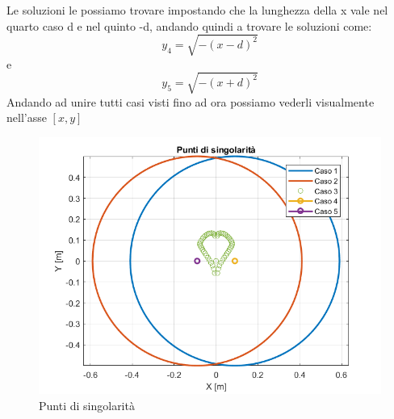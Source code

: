 Le soluzioni le possiamo trovare impostando che la lunghezza della x vale nel quarto caso d e nel quinto -d, andando quindi a trovare le soluzioni come:
\begin{equation}
    y_4 = \sqrt{-(x-d)^2}
\end{equation}
e
\begin{equation}
    y_5 = \sqrt{-(x+d)^2}
\end{equation}
Andando ad unire tutti casi visti fino ad ora possiamo vederli visualmente nell'asse $[x,y]$
\begin{figure}[ht]
\begin{center}
    \includegraphics[scale=0.65]{Immagini/Singolarity/SingNew}
    \caption{Punti di singolarità}
    \label{puntiSing}
\end{center}
\end{figure}
